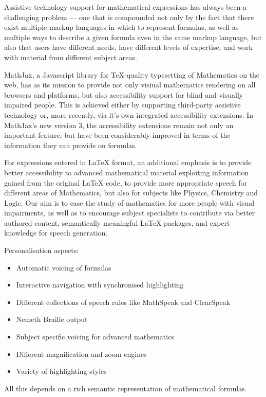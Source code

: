 \documentclass{sig-alternate}
\begin{document}
Assistive technology support for mathematical expressions has always been a
challenging problem --- one that is compounded not only by the fact that there exist
multiple markup languages in which to represent formulas, as well as multiple ways to
describe a given formula even in the same markup
language, but also that users have different needs, have different levels of
expertise, and work with material from different subject areas.

MathJax, a Javascript library for TeX-quality typesetting of Mathematics on the
web, has as its mission to provide not only visiual mathematics rendering on all
browsers and platforms, but also
accessibility support for blind and visually impaired people. This is achieved
either by supporting third-party assistive technology or, more recently, via
it's own integrated accessibility extensions. In MathJax's new version 3, the
accessibility extensions remain not only an important feature, but have been
considerably improved in terms of the information they can provide on formulas.

For expressions entered in {\LaTeX} format, an additional
emphasis is to provide better accessibility to advanced mathematical
material exploiting information gained from the original {\LaTeX} code, to provide
more appropriate speech for different areas of Mathematics, but also for subjects
like Physics, Chemistry and Logic.  Our aim is to ease the study of mathematics
for more people with visual impairments, as well as to encourage subject
specialists to contribute via better authored content, semantically meaningful
{\LaTeX} packages, and expert knowledge for speech generation.


Personalisation aspects:

\begin{itemize}
\item Automatic voicing of formulas
\item Interactive navigation with synchronised highlighting
\item Different collections of speech rules like MathSpeak and ClearSpeak
\item Nemeth Braille output
\item Subject specific voicing for advanced mathematics
\item Different magnification and zoom engines
\item Variety of highlighting styles
\end{itemize}

All this depends on a rich semantic representation of mathematical formulas.
\end{document}
